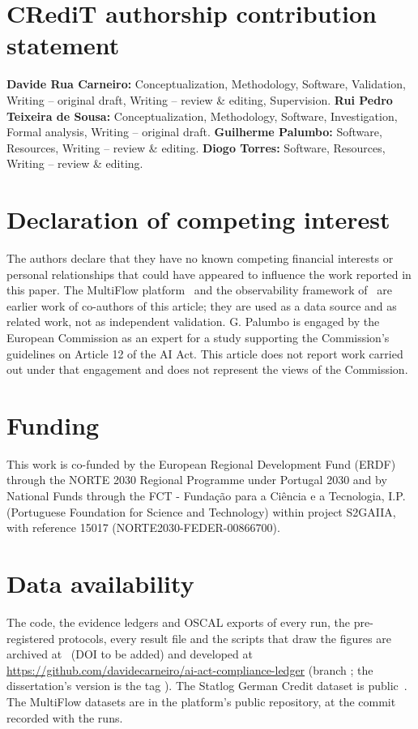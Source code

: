 
\section*{CRediT authorship contribution statement}
\textbf{Davide Rua Carneiro:} Conceptualization, Methodology, Software, Validation, Writing -- original draft, Writing -- review \& editing, Supervision.
\textbf{Rui Pedro Teixeira de Sousa:} Conceptualization, Methodology, Software, Investigation, Formal analysis, Writing -- original draft.
\textbf{Guilherme Palumbo:} Software, Resources, Writing -- review \& editing.
\textbf{Diogo Torres:} Software, Resources, Writing -- review \& editing.

\section*{Declaration of competing interest}
The authors declare that they have no known competing financial interests or personal relationships that could have appeared to influence the work reported in this paper. The MultiFlow platform~\cite{torres2026} and the observability framework of~\cite{palumbo2025} are earlier work of co-authors of this article; they are used as a data source and as related work, not as independent validation. G. Palumbo is engaged by the European Commission as an expert for a study supporting the Commission’s guidelines on Article 12 of the AI Act. This article does not report work carried out under that engagement and does not represent the views of the Commission.

\section*{Funding}
This work is co-funded by the European Regional Development Fund (ERDF) through the NORTE 2030 Regional Programme under Portugal 2030 and by National Funds through the FCT - Fundação para a Ciência e a Tecnologia, I.P. (Portuguese Foundation for Science and Technology) within project S2GAIIA, with reference 15017 (NORTE2030-FEDER-00866700).


\section*{Data availability}
The code, the evidence ledgers and OSCAL exports of every run, the pre-registered protocols, every result file and the scripts that draw the figures are archived at~\cite{artefacts} (DOI to be added) and developed at \url{https://github.com/davidecarneiro/ai-act-compliance-ledger} (branch ; the dissertation's version is the tag ). The Statlog German Credit dataset is public~\cite{hofmann1994}. The MultiFlow datasets are in the platform's public repository, at the commit recorded with the runs.

